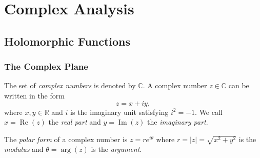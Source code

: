 \part{Complex Analysis}

\chapter{Holomorphic Functions}

\section{The Complex Plane}

\begin{definition}
  The set of \emph{complex numbers} is denoted by $\mathbb{C}$. A complex number $z \in \mathbb{C}$ can be written in the form
  \begin{equation}
    z = x + iy,
  \end{equation}
  where $x, y \in \mathbb{R}$ and $i$ is the imaginary unit satisfying $i^2 = -1$.
  We call $x = \operatorname{Re}(z)$ the \emph{real part} and $y = \operatorname{Im}(z)$ the \emph{imaginary part}.
\end{definition}

\begin{center}
\end{center}

The \emph{polar form} of a complex number is $z = r e^{i\theta}$ where $r = |z| = \sqrt{x^2 + y^2}$ is the \emph{modulus} and $\theta = \arg(z)$ is the \emph{argument}.

